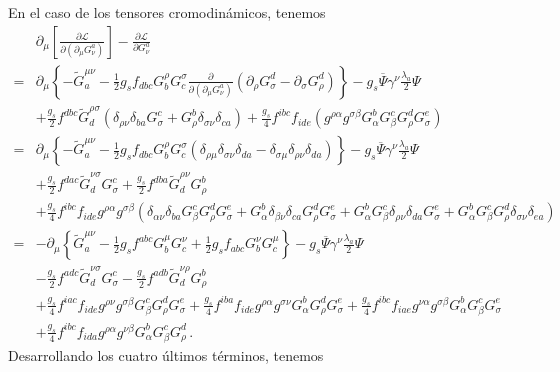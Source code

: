 En el caso de los tensores cromodinámicos, tenemos
\begin{align}
  &\partial_\mu\left[\frac{\partial\mathcal{L}}{\partial\left(\partial_\mu G_\nu^a\right)}\right]-\frac{\partial\mathcal{L}}{\partial G_\nu^a}\nonumber\\
=&\partial_\mu\left\{-  \widetilde{G}^{\mu\nu}_a-\frac{1}{2}g_s f_{dbc}G_b^\rho G^\sigma_c\frac{\partial}{\partial\left(\partial_\mu G_\nu^a\right)}
\left(\partial_\rho G_\sigma^d-\partial_\sigma G_\rho^d\right)\right\}
-g_s\overline{\Psi}\gamma^\nu\frac{\lambda_a}{2}\Psi\nonumber\\
&+\frac{g_s}{2} f^{dbc}\widetilde{G}^{\rho\sigma}_d(\delta_{\rho\nu}\delta_{ba}G^c_\sigma+G^b_\rho\delta_{\sigma\nu}\delta_{ca})
+\frac{g_s}{4}f^{ibc}f_{ide}(g^{\rho\alpha}g^{\sigma\beta}G^b_{\alpha}G^c_\beta G^d_\rho G^e_\sigma)\nonumber\\
  =&\partial_\mu\left\{- \widetilde{G}^{\mu\nu}_a-\frac{1}{2}g_s f_{dbc}G_b^\rho G^\sigma_c
\left(\delta_{\rho\mu}\delta_{\sigma\nu}\delta_{da}-\delta_{\sigma\mu}\delta_{\rho\nu}\delta_{da}\right)\right\}
-g_s\overline{\Psi}\gamma^\nu\frac{\lambda_a}{2}\Psi\nonumber\\
&+\frac{g_s}{2} f^{dac}\widetilde{G}^{\nu\sigma}_dG^c_\sigma
+\frac{g_s}{2} f^{dba}\widetilde{G}^{\rho\nu}_dG^b_\rho\nonumber\\
&+\frac{g_s}{4}f^{ibc}f_{ide}g^{\rho\alpha}g^{\sigma\beta}(\delta_{\alpha\nu}\delta_{ba}G^c_\beta G^d_\rho G^e_\sigma+G^b_{\alpha}\delta_{\beta\nu}\delta_{ca}G^d_\rho G^e_\sigma+G^b_{\alpha}G^c_\beta\delta_{\rho\nu}\delta_{da}G^e_\sigma+G^b_{\alpha}G^c_\beta G^d_\rho\delta_{\sigma\nu}\delta_{ea})\nonumber\\
  =&-\partial_\mu\left\{  \widetilde{G}^{\mu\nu}_a-\frac{1}{2}g_s f^{abc}G_b^\mu G^\nu_c
+\frac{1}{2}g_s f_{abc}G_b^\nu G^\mu_c\right\}
-g_s\overline{\Psi}\gamma^\nu\frac{\lambda_a}{2}\Psi\nonumber\\
&-\frac{g_s}{2} f^{adc}\widetilde{G}^{\nu\sigma}_dG^c_\sigma
-\frac{g_s}{2} f^{adb}\widetilde{G}^{\nu\rho}_dG^b_\rho\nonumber\\
&+\frac{g_s}{4}f^{iac}f_{ide}g^{\rho\nu}g^{\sigma\beta}G^c_\beta G^d_\rho G^e_\sigma
+\frac{g_s}{4}f^{iba}f_{ide}g^{\rho\alpha}g^{\sigma\nu}G^b_{\alpha}G^d_\rho G^e_\sigma
+\frac{g_s}{4}f^{ibc}f_{iae}g^{\nu\alpha}g^{\sigma\beta}G^b_{\alpha}G^c_\beta G^e_\sigma\nonumber\\
&+\frac{g_s}{4}f^{ibc}f_{ida}g^{\rho\alpha}g^{\nu\beta}G^b_{\alpha}G^c_\beta G^d_\rho\,.
\end{align}
Desarrollando los cuatro últimos términos, tenemos

